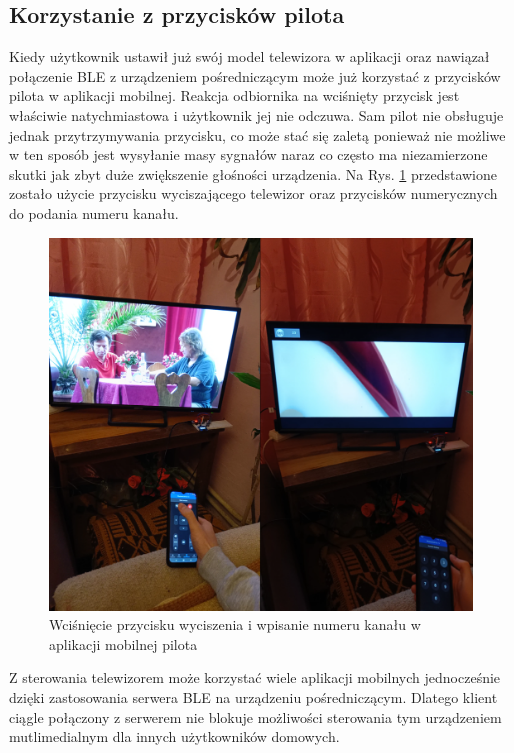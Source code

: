 \documentclass[12pt,twoside]{article}
\begin{document}
\subsection{Korzystanie z przycisków pilota}
Kiedy użytkownik ustawił już swój model telewizora w aplikacji oraz nawiązał połączenie BLE z urządzeniem pośredniczącym może już korzystać z przycisków pilota w aplikacji mobilnej. Reakcja odbiornika na wciśnięty przycisk jest właściwie natychmiastowa i użytkownik jej nie odczuwa. Sam pilot nie obsługuje jednak przytrzymywania przycisku, co może stać się zaletą ponieważ nie możliwe w ten sposób jest wysyłanie masy sygnałów naraz co często ma niezamierzone skutki jak zbyt duże zwiększenie głośności urządzenia. Na Rys. \ref*{Fig:buttonsTest} przedstawione zostało użycie przycisku wyciszającego telewizor oraz przycisków numerycznych do podania numeru kanału.

\begin{figure}[ht]
   \centering
   \includegraphics[width=13cm]{images/buttonsTest.png}
   \caption{Wciśnięcie przycisku wyciszenia i wpisanie numeru kanału w aplikacji mobilnej pilota}
   \label{Fig:buttonsTest}
\end{figure}

Z sterowania telewizorem może korzystać wiele aplikacji mobilnych jednocześnie dzięki zastosowania serwera BLE na urządzeniu pośredniczącym. Dlatego klient ciągle połączony z serwerem nie blokuje możliwości sterowania tym urządzeniem mutlimedialnym dla innych użytkowników domowych.
\end{document}
